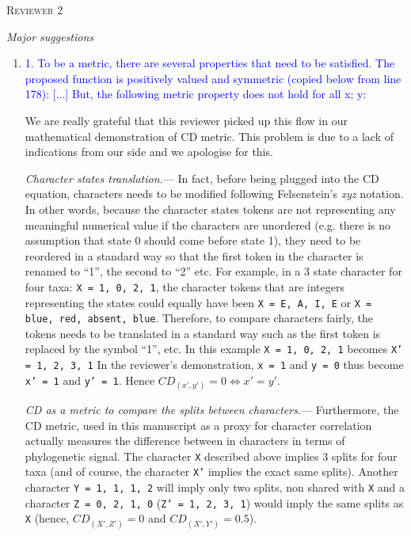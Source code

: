\documentclass[12pt,letterpaper]{article}
\renewcommand{\section}[1]{%
\bigskip
\begin{center}
\begin{Large}
\normalfont\scshape #1
\medskip
\end{Large}
\end{center}}
\renewcommand{\subsection}[1]{%
\bigskip
\begin{center}
\begin{large}
\normalfont\itshape #1
\end{large}
\end{center}}
\renewcommand{\subsubsection}[1]{%
\vspace{2ex}
\noindent
\textit{#1.}---}
\begin{document}
\section{Reviewer 2}

\subsection{Major suggestions}

\begin{enumerate}

\item{\textcolor{blue}{1. To be a metric, there are several properties that need to be satisfied. The proposed function
is positively valued and symmetric (copied below from line 178): [...] But, the following metric property does not hold for all x; y:}}
\label{proof}

We are really grateful that this reviewer picked up this flow in our mathematical demonstration of CD metric.
This problem is due to a lack of indications from our side and we apologise for this.

\subsubsection{Character states translation}
In fact, before being plugged into the CD equation, characters needs to be modified following Felsenstein's \textit{xyz} notation.
In other words, because the character states tokens are not representing any meaningful numerical value if the characters are unordered (e.g. there is no assumption that state 0 should come before state 1), they need to be reordered in a standard way so that the first token in the character is renamed to ``1'', the second to ``2'' etc.
For example, in a 3 state character for four taxa: \texttt{X = {1, 0, 2, 1}}, the character tokens that are integers representing the states could equally have been \texttt{X = {E, A, I, E}} or \texttt{X = {blue, red, absent, blue}}.
Therefore, to compare characters fairly, the tokens needs to be translated in a standard way such as the first token is replaced by the symbol ``1'', etc.
In this example \texttt{X = {1, 0, 2, 1}} becomes \texttt{X' = {1, 2, 3, 1}}
In the reviewer's demonstration, \texttt{x  = {1}} and \texttt{y  = {0}} thus become \texttt{x'  = {1}} and \texttt{y'  = {1}}.
Hence $CD_{(x',y')} = 0 \Leftrightarrow x' = y'$.

\subsubsection{CD as a metric to compare the splits between characters}
Furthermore, the CD metric, used in this manuscript as a proxy for character correlation actually measures the difference between in characters in terms of phylogenetic signal.
The character \texttt{X} described above implies 3 splits for four taxa (and of course, the character \texttt{X'} implies the exact same splits).
Another character \texttt{Y = {1, 1, 1, 2}} will imply only two splits, non shared with \texttt{X} and a character \texttt{Z = {0, 2, 1, 0}} (\texttt{Z' = {1, 2, 3, 1}}) would imply the same splits as \texttt{X} (hence, $CD_{(X',Z')} = 0$ and $CD_{(X',Y')} = 0.5$).


\end{enumerate}
\end{document}
